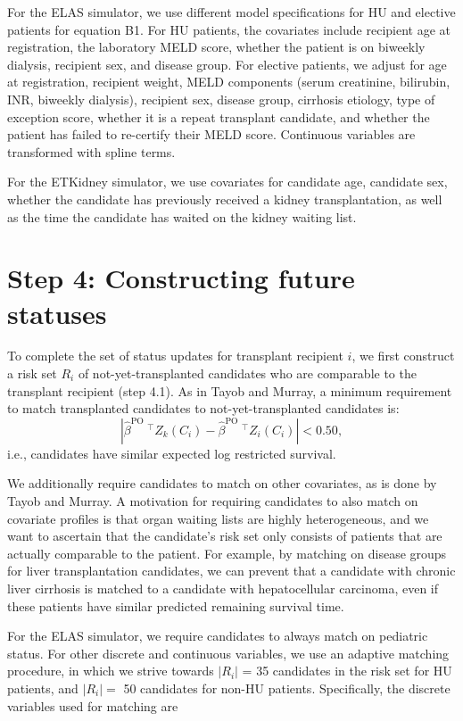 \documentclass[11pt,twoside,]{book}
\begin{document}
For the ELAS simulator, we use different model specifications for HU
and elective patients for equation B1. For HU patients, the covariates
include recipient age at registration, the laboratory MELD score, whether the
patient is on biweekly dialysis, recipient sex, and disease group. For
elective patients, we adjust for age at registration, recipient weight,
MELD components (serum creatinine, bilirubin, INR, biweekly dialysis),
recipient sex, disease group, cirrhosis etiology, type of exception
score, whether it is a repeat transplant candidate, and whether the patient
has failed to re-certify their MELD score. Continuous variables are
transformed with spline terms.

For the ETKidney simulator, we use covariates for candidate age, candidate sex,
whether the candidate has previously received a kidney transplantation,
as well as the time the candidate has waited on the kidney waiting list.

\newpage

\section{Step 4: Constructing future statuses}\label{step-4-constructing-future-statuses}

To complete the set of status updates for transplant recipient \(i\),
we first construct a risk set \(R_i\) of not-yet-transplanted candidates who
are comparable to the transplant recipient (step 4.1).
As in Tayob and Murray, a minimum requirement to match transplanted
candidates to not-yet-transplanted candidates is:
\[|\hat{\beta}^{\text{PO}}\ ^\intercal Z_k(C_{i}) - \hat{\beta}^{\text{PO}}\ ^\intercal Z_i(C_{i})| < 0.50,\]
i.e., candidates have similar expected log restricted survival.

We additionally require candidates to match on other covariates,
as is done by Tayob and Murray. A motivation for requiring candidates to
also match on covariate profiles is that organ waiting lists are highly
heterogeneous, and we want to ascertain that the candidate's risk set
only consists of patients that are actually comparable to the patient. For example, by matching on disease groups for
liver transplantation candidates, we can prevent that a candidate
with chronic liver cirrhosis is matched to a candidate with hepatocellular
carcinoma, even if these patients have similar predicted remaining
survival time.

For the ELAS simulator, we require candidates to always match on pediatric status. For other discrete and continuous variables, we use an adaptive matching procedure,
in which we strive towards \(|R_i|\) = 35 candidates in the risk set for HU patients, and \(|R_i| =\) 50
candidates for non-HU patients. Specifically, the discrete variables used for matching are
\end{document}
